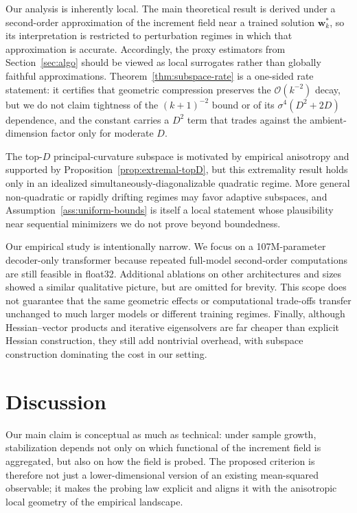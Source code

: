 \documentclass{article}
\begin{document}
Our analysis is inherently local. The main theoretical result is derived under a second-order approximation of the increment field near a trained solution $\mathbf w_k^*$, so its interpretation is restricted to perturbation regimes in which that approximation is accurate. Accordingly, the proxy estimators from Section~\ref{sec:algo} should be viewed as local surrogates rather than globally faithful approximations. Theorem~\ref{thm:subspace-rate} is a one-sided rate statement: it certifies that geometric compression preserves the $\mathcal O(k^{-2})$ decay, but we do not claim tightness of the $(k+1)^{-2}$ bound or of its $\sigma^4(D^2+2D)$ dependence, and the constant carries a $D^2$ term that trades against the ambient-dimension factor only for moderate $D$.

The top-$D$ principal-curvature subspace is motivated by empirical anisotropy and supported by Proposition~\ref{prop:extremal-topD}, but this extremality result holds only in an idealized simultaneously-diagonalizable quadratic regime. More general non-quadratic or rapidly drifting regimes may favor adaptive subspaces, and Assumption~\ref{ass:uniform-bounds} is itself a local statement whose plausibility near sequential minimizers we do not prove beyond boundedness.

Our empirical study is intentionally narrow. We focus on a 107M-parameter decoder-only transformer because repeated full-model second-order computations are still feasible in float32. Additional ablations on other architectures and sizes showed a similar qualitative picture, but are omitted for brevity. This scope does not guarantee that the same geometric effects or computational trade-offs transfer unchanged to much larger models or different training regimes. Finally, although Hessian--vector products and iterative eigensolvers are far cheaper than explicit Hessian construction, they still add nontrivial overhead, with subspace construction dominating the cost in our setting.

\section{Discussion}
\label{sec:discussion}

Our main claim is conceptual as much as technical: under sample growth, stabilization depends not only on which functional of the increment field is aggregated, but also on how the field is probed. The proposed criterion is therefore not just a lower-dimensional version of an existing mean-squared observable; it makes the probing law explicit and aligns it with the anisotropic local geometry of the empirical landscape.
\end{document}
